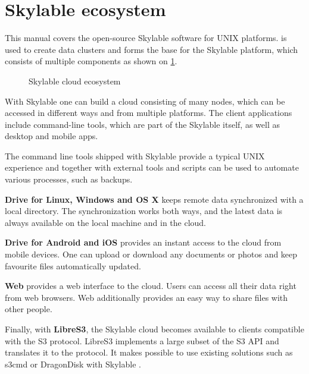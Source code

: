 \section{Skylable ecosystem}
This manual covers the open-source Skylable \SX software for UNIX platforms.
\SX is used to create data clusters and forms the base for the Skylable
platform, which consists of multiple components as shown on \ifpdf{}\else\ref{fig:components}.\fi
\ifpdf
\begin{figure}
    \centering
    
    \caption{Skylable cloud ecosystem}
    \label{fig:components}
\end{figure}
\fi
With Skylable \SX one can build a cloud consisting of many nodes, which can
be accessed in different ways and from multiple platforms. The client
applications include command-line tools, which are part of the Skylable \SX
itself, as well as desktop and mobile apps.

The command line tools shipped with Skylable \SX provide a typical UNIX
experience and together with external tools and scripts can be used to
automate various processes, such as backups.

\textbf{\SX Drive for Linux, Windows and OS X} keeps remote data synchronized with
a local directory. The synchronization works both ways, and the latest data
is always available on the local machine and in the cloud.

\textbf{\SX Drive for Android and iOS} provides an instant access to the cloud from
mobile devices. One can upload or download any documents or photos and keep
favourite files automatically updated.

\textbf{\SX Web} provides a web interface to the cloud. Users can access all their
data right from web browsers. \SX Web additionally provides an easy way to
share files with other people.

Finally, with \textbf{LibreS3}, the Skylable cloud becomes available to clients
compatible with the S3 protocol. LibreS3 implements a large subset of the
S3 API and translates it to the \SX protocol. It makes possible to use
existing solutions such as s3cmd or DragonDisk with Skylable \SX.
